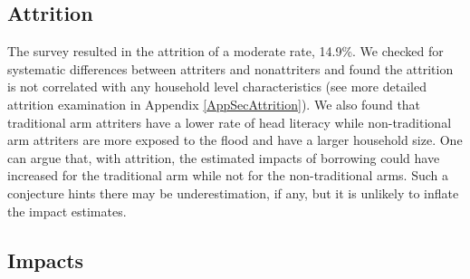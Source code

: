 \subsection{Attrition}
\label{SecAttrition}

	The survey resulted in the attrition of a moderate rate, 14.9\%. We checked for systematic differences between attriters and nonattriters 
	and found the attrition is not correlated with any household level characteristics (see more detailed attrition examination in Appendix \ref{AppSecAttrition}). %
	We also found that \textsf{traditional} arm attriters have a lower rate of head literacy while non-\textsf{traditional} arm attriters are more exposed to the flood and have a larger household size. One can argue that, with attrition, the estimated impacts of borrowing could have increased for the \textsf{traditional} arm while not for the non-\textsf{traditional} arms. Such a conjecture hints there may be underestimation, if any, but it is unlikely to inflate the impact estimates.

\subsection{Impacts}
\label{Sec Impacts}

